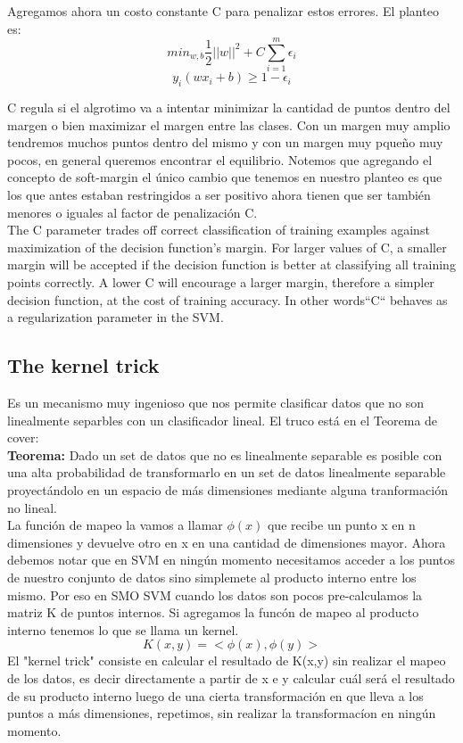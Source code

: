 \documentclass[titlepage,a4paper]{article}
\begin{document}
Agregamos ahora un costo constante C para penalizar estos errores. El planteo es: $$ min_{w,b} \frac{1}{2} ||w||^2 +C \sum_{i=1}^m \epsilon_i$$ $$y_i (wx_i +b) \geq 1-\epsilon_i$$

C regula si el algrotimo va a intentar minimizar la cantidad de puntos dentro del margen o bien maximizar el margen entre las clases. Con un margen muy amplio tendremos muchos puntos dentro del mismo y con un margen muy pqueño muy pocos, en general queremos encontrar el equilibrio. Notemos que agregando el concepto de soft-margin el único cambio que tenemos en nuestro planteo es que los que antes estaban restringidos a ser positivo ahora tienen que ser también menores o iguales al factor de penalización C. \\


The C parameter trades off correct classification of training examples against maximization of the decision function’s margin. For larger values of C, a smaller margin will be accepted if the decision function is better at classifying all training points correctly. A lower C will encourage a larger margin, therefore a simpler decision function, at the cost of training accuracy. In other words``C`` behaves as a regularization parameter in the SVM.


\subsection*{The kernel trick} 
Es un mecanismo muy ingenioso que nos permite clasificar datos que no son linealmente separbles con un clasificador lineal. El truco está en el Teorema de cover: \\

\textbf{Teorema:} Dado un set de datos que no es linealmente separable es posible con una alta probabilidad de transformarlo en un set de datos linealmente separable proyectándolo  en un espacio de más dimensiones mediante alguna tranformación no lineal.  \\

La función de mapeo la vamos a llamar $\phi (x)$ que recibe un punto x en n dimensiones y devuelve otro en x en una cantidad de dimensiones mayor. Ahora debemos notar que en SVM en ningún momento necesitamos acceder a los puntos de nuestro conjunto de datos sino simplemete al producto interno entre los mismo. Por eso en SMO SVM cuando los datos son pocos pre-calculamos la matriz K de puntos  internos. Si agregamos la funcón de mapeo al producto interno tenemos lo que se llama un kernel. $$K(x,y) = <\phi (x), \phi (y)>$$ 
El "kernel trick" consiste en calcular el resultado de K(x,y) sin realizar el mapeo de los datos, es decir directamente a partir de x e y  calcular cuál será el resultado de su producto interno luego de una cierta transformación en que lleva a los puntos a más dimensiones, repetimos, sin realizar la transformacíon en ningún momento. 
\end{document}
